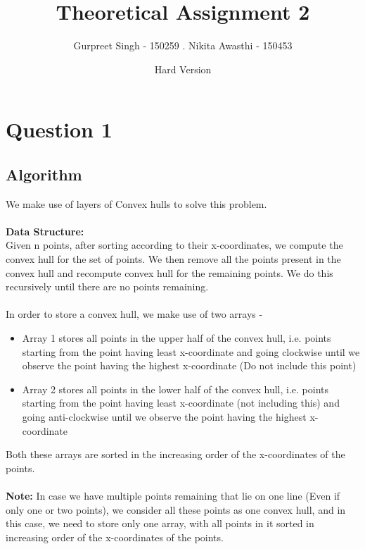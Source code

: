 \documentclass{article}
\title{Theoretical Assignment 2}
\author{Gurpreet Singh - 150259 . Nikita Awasthi - 150453}
\date{Hard Version}
\begin{document}
\maketitle

\section*{Question 1}
    \subsection*{Algorithm}
        We make use of layers of Convex hulls to solve this problem.
        \\
        \\
        \textbf{Data Structure:}
        \\
        Given n points, after sorting according to their x-coordinates, we compute the convex hull for the set of points. We then remove all the points present in the convex hull and recompute convex hull for the remaining points. We do this recursively until there are no points remaining.
        \\
        \\
        In order to store a convex hull, we make use of two arrays -
        \begin{itemize}
            \item Array 1 stores all points in the upper half of the convex hull, i.e. points starting from the point having least x-coordinate and going clockwise until we observe the point having the highest x-coordinate (Do not include this point)
            \item Array 2 stores all points in the lower half of the convex hull, i.e. points starting from the point having least x-coordinate (not including this) and going anti-clockwise until we observe the point having the highest x-coordinate
            \\
        \end{itemize}
        Both these arrays are sorted in the increasing order of the x-coordinates of the points.
        \\
        \\
        \textbf{Note:} In case we have multiple points remaining that lie on one line (Even if only one or two points), we consider all these points as one convex hull, and in this case, we need to store only one array, with all points in it sorted in increasing order of the x-coordinates of the points.
        \\
\end{document}
